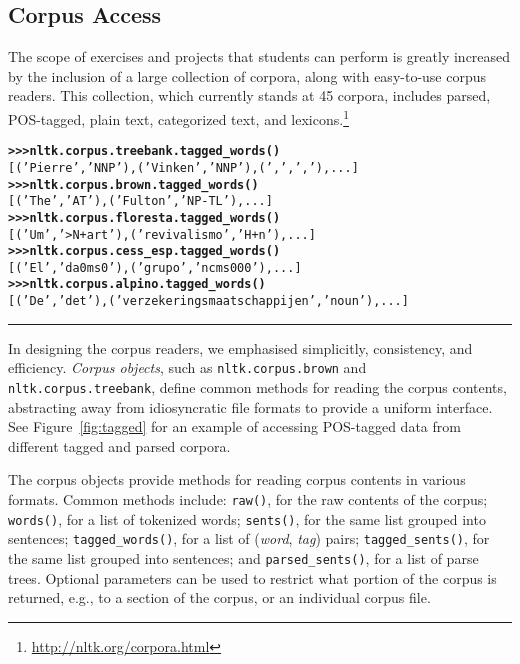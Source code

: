 \documentclass[11pt]{article}
\newcommand{\code}[1]{\texttt{\small #1}}
\begin{document}
\subsection{Corpus Access}

The scope of exercises and projects that students can perform is
greatly increased by the inclusion of a large collection of corpora,
along with easy-to-use corpus readers.  This collection, which
currently stands at 45 corpora, includes parsed, POS-tagged, plain
text, categorized text, and lexicons.\footnote{\url{http://nltk.org/corpora.html}}

\begin{figure*}[t]
{\small
\begin{alltt}
\textbf{>>> nltk.corpus.treebank.tagged_words()}
[('Pierre', 'NNP'), ('Vinken', 'NNP'), (',', ','), ...]
\textbf{>>> nltk.corpus.brown.tagged_words()}
[('The', 'AT'), ('Fulton', 'NP-TL'), ...]
\textbf{>>> nltk.corpus.floresta.tagged_words()}
[('Um', '>N+art'), ('revivalismo', 'H+n'), ...]
\textbf{>>> nltk.corpus.cess_esp.tagged_words()}
[('El', 'da0ms0'), ('grupo', 'ncms000'), ...]
\textbf{>>> nltk.corpus.alpino.tagged_words()}
[('De', 'det'), ('verzekeringsmaatschappijen', 'noun'), ...]
\end{alltt}}
\caption{Accessing Different Corpora via a Uniform Interface}
\label{fig:tagged}
\vspace*{1ex}\hrule
\end{figure*}

In designing the corpus readers, we emphasised simplicitly,
consistency, and efficiency.  \emph{Corpus objects}, such as
\code{nltk.corpus.brown} and \code{nltk.corpus.treebank}, define
common methods for reading the corpus contents, abstracting
away from idiosyncratic file formats to provide a uniform interface.
See Figure~\ref{fig:tagged} for an example of accessing POS-tagged
data from different tagged and parsed corpora.

The corpus objects provide methods for reading corpus contents
in various formats.  Common methods include:
%
\code{raw()}, for the raw contents of the corpus;
\code{words()}, for a list of tokenized words;
\code{sents()}, for the same list grouped into sentences;
\code{tagged\_words()}, for a list of (\textit{word}, \textit{tag}) pairs;
\code{tagged\_sents()}, for the same list grouped into sentences;
and
\code{parsed\_sents()}, for a list of parse trees.
%
Optional parameters can be used to restrict what portion of the corpus
is returned, e.g., to a section of the corpus, or an individual corpus
file.
\end{document}
